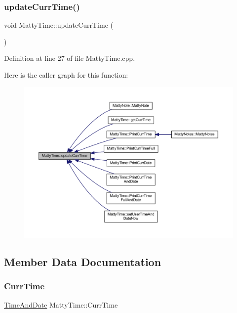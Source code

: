 \subsubsection{\texorpdfstring{update\+Curr\+Time()}{updateCurrTime()}}
{\footnotesize\ttfamily void Matty\+Time\+::update\+Curr\+Time (\begin{DoxyParamCaption}{ }\end{DoxyParamCaption})\hspace{0.3cm}{\ttfamily [static]}}



Definition at line 27 of file Matty\+Time.\+cpp.

Here is the caller graph for this function\+:
\nopagebreak
\begin{figure}[H]
\begin{center}
\leavevmode
\includegraphics[width=350pt]{classMattyTime_a52a7500e419fe56d10ddf2715fc96d06_icgraph}
\end{center}
\end{figure}


\subsection{Member Data Documentation}
\hypertarget{classMattyTime_a458337456f43243073ae78976e86618f}{}\label{classMattyTime_a458337456f43243073ae78976e86618f} 
\subsubsection{\texorpdfstring{Curr\+Time}{CurrTime}}
{\footnotesize\ttfamily \hyperlink{structTimeAndDate}{Time\+And\+Date} Matty\+Time\+::\+Curr\+Time\hspace{0.3cm}{\ttfamily [static]}}



